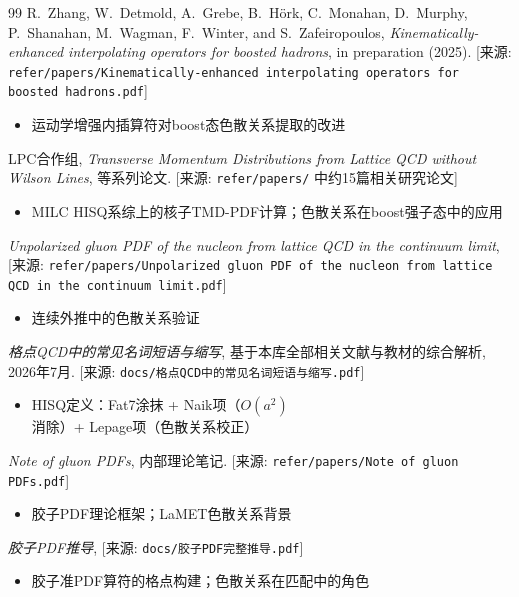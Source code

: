 \documentclass[12pt,a4paper]{ctexart}
\theoremstyle{definition}
\begin{document}
\begin{thebibliography}{99}
R.~Zhang, W.~Detmold, A.~Grebe, B.~H\"ork, C.~Monahan, D.~Murphy, P.~Shanahan, M.~Wagman, F.~Winter, and S.~Zafeiropoulos,
\textit{Kinematically-enhanced interpolating operators for boosted hadrons},
in preparation (2025).
[来源: \texttt{refer/papers/Kinematically-enhanced interpolating operators for boosted hadrons.pdf}]
\begin{itemize}
    \item 运动学增强内插算符对boost态色散关系提取的改进
\end{itemize}

LPC合作组,
\textit{Transverse Momentum Distributions from Lattice QCD without Wilson Lines},
等系列论文.
[来源: \texttt{refer/papers/} 中约15篇相关研究论文]
\begin{itemize}
    \item MILC HISQ系综上的核子TMD-PDF计算；色散关系在boost强子态中的应用
\end{itemize}

\textit{Unpolarized gluon PDF of the nucleon from lattice QCD in the continuum limit},
[来源: \texttt{refer/papers/Unpolarized gluon PDF of the nucleon from lattice QCD in the continuum limit.pdf}]
\begin{itemize}
    \item 连续外推中的色散关系验证
\end{itemize}

\textit{格点QCD中的常见名词短语与缩写},
基于本库全部相关文献与教材的综合解析, 2026年7月.
[来源: \texttt{docs/格点QCD中的常见名词短语与缩写.pdf}]
\begin{itemize}
    \item HISQ定义：Fat7涂抹 + Naik项（$O(a^2)$消除）+ Lepage项（色散关系校正）
\end{itemize}

\textit{Note of gluon PDFs},
内部理论笔记.
[来源: \texttt{refer/papers/Note of gluon PDFs.pdf}]
\begin{itemize}
    \item 胶子PDF理论框架；LaMET色散关系背景
\end{itemize}

\textit{胶子PDF推导},
[来源: \texttt{docs/胶子PDF完整推导.pdf}]
\begin{itemize}
    \item 胶子准PDF算符的格点构建；色散关系在匹配中的角色
\end{itemize}

\end{thebibliography}
\end{document}
